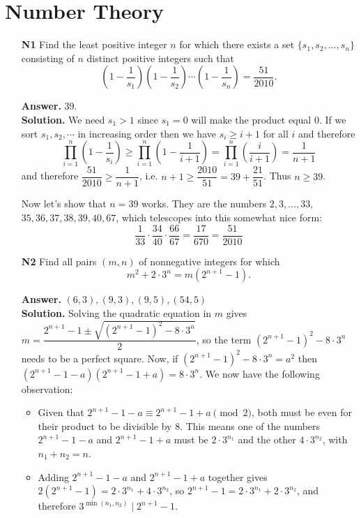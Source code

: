 \documentclass[11pt]{article}
\newcommand{\<}{\langle}
\renewcommand{\>}{\rangle}
\begin{document}
\section*{Number Theory}
\begin{enumerate}
	\item [\textbf{N1}] Find the least positive integer $n$ for which there exists a set $\{s_1, s_2, \ldots , s_n\}$ consisting of $n$ distinct positive integers such that
	\[ \left( 1 - \frac{1}{s_1} \right) \left( 1 - \frac{1}{s_2} \right) \cdots \left( 1 - \frac{1}{s_n} \right) = \frac{51}{2010}.\]
	
	\textbf{Answer.} 39. \\
	\textbf{Solution.} We need $s_1>1$ since $s_1=0$ will make the product equal 0. If we sort $s_1, s_2, \cdots$ in increasing order then we have $s_i\ge i+1$ for all $i$ and therefore 
	\[
	\displaystyle\prod_{i=1}^n \left(1-\frac {1}{s_i}\right)
	\ge \displaystyle\prod_{i=1}^n\left(1-\frac {1}{i+1}\right)
	=\displaystyle\prod_{i=1}^n\left(\frac {i}{i+1}\right)
	=\dfrac{1}{n+1}
	\]
	and therefore $\dfrac{51}{2010}\ge \dfrac{1}{n+1}$, i.e. $n+1\ge \dfrac{2010}{51}=39+\dfrac{21}{51}$. Thus $n\ge 39$. 
	
	Now let's show that $n=39$ works. They are the numbers $2, 3, ..., 33$, $35, 36, 37, 38, 39, 40, 67$, which telescopes into this somewhat nice form: 
	\[\frac {1}{33}\cdot\frac{34}{40}\cdot\frac{66}{67}=\frac{17}{670}=\frac{51}{2010}
	\]
	
	\item [\textbf{N2}] Find all pairs $(m,n)$ of nonnegative integers for which \[m^2 + 2 \cdot 3^n = m\left(2^{n+1} - 1\right).\]
	
	\textbf{Answer.} $(6, 3), (9, 3), (9, 5), (54, 5)$\\
	\textbf{Solution.} Solving the quadratic equation in $m$ gives $m=\dfrac{2^{n+1}-1 \pm \sqrt{(2^{n+1}-1)^2 - 8\cdot 3^n}}{2}$, so the term $(2^{n+1}-1)^2 - 8\cdot 3^n$ needs to be a perfect square. Now, if $(2^{n+1}-1)^2 - 8\cdot 3^n = a^2$ then $(2^{n+1}-1-a)(2^{n+1}-1+a)=8\cdot 3^n$. We now have the following observation: 
	
	\begin{itemize}
		\item Given that $2^{n+1}-1-a\equiv 2^{n+1}-1+a\pmod{2}$, both must be even for their product to be divisible by 8. This means one of the numbers $2^{n+1}-1-a$ and $2^{n+1}-1+a$ must be $2\cdot 3^{n_1}$ and the other $4\cdot 3^{n_2}$, with $n_1+n_2=n$. 
		
		\item Adding $2^{n+1}-1-a$ and $2^{n+1}-1+a$ together gives $2(2^{n+1}-1)=2\cdot 3^{n_1}+4\cdot 3^{n_2}$, so $2^{n+1}-1=2\cdot 3^{n_1}+2\cdot 3^{n_2}$, and therefore $3^{\min(n_1, n_2)}\mid 2^{n+1}-1$. 
	\end{itemize}
	

\end{enumerate}
\end{document}
